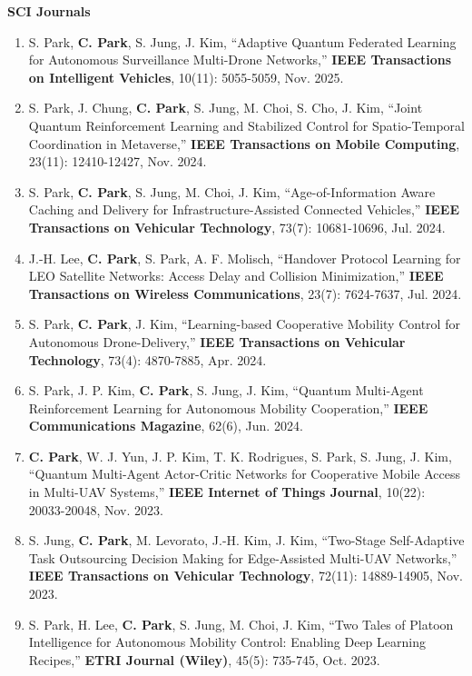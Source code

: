 \documentclass[10.5pt,a4paper]{article}
\begin{document}
\textbf{SCI Journals}
\begin{enumerate}[leftmargin=1.4em, itemsep=3pt, topsep=2pt]
  \item S. Park, \textbf{C. Park}, S. Jung, J. Kim, ``Adaptive Quantum Federated Learning for Autonomous Surveillance Multi-Drone Networks,'' \textbf{IEEE Transactions on Intelligent Vehicles}, 10(11): 5055-5059, Nov. 2025.
  \item S. Park, J. Chung, \textbf{C. Park}, S. Jung, M. Choi, S. Cho, J. Kim, ``Joint Quantum Reinforcement Learning and Stabilized Control for Spatio-Temporal Coordination in Metaverse,'' \textbf{IEEE Transactions on Mobile Computing}, 23(11): 12410-12427, Nov. 2024.
  \item S. Park, \textbf{C. Park}, S. Jung, M. Choi, J. Kim, ``Age-of-Information Aware Caching and Delivery for Infrastructure-Assisted Connected Vehicles,'' \textbf{IEEE Transactions on Vehicular Technology}, 73(7): 10681-10696, Jul. 2024.
  \item J.-H. Lee, \textbf{C. Park}, S. Park, A. F. Molisch, ``Handover Protocol Learning for LEO Satellite Networks: Access Delay and Collision Minimization,'' \textbf{IEEE Transactions on Wireless Communications}, 23(7): 7624-7637, Jul. 2024.
  \item S. Park, \textbf{C. Park}, J. Kim, ``Learning-based Cooperative Mobility Control for Autonomous Drone-Delivery,'' \textbf{IEEE Transactions on Vehicular Technology}, 73(4): 4870-7885, Apr. 2024.
  \item S. Park, J. P. Kim, \textbf{C. Park}, S. Jung, J. Kim, ``Quantum Multi-Agent Reinforcement Learning for Autonomous Mobility Cooperation,'' \textbf{IEEE Communications Magazine}, 62(6), Jun. 2024.
  \item \textbf{C. Park}, W. J. Yun, J. P. Kim, T. K. Rodrigues, S. Park, S. Jung, J. Kim, ``Quantum Multi-Agent Actor-Critic Networks for Cooperative Mobile Access in Multi-UAV Systems,'' \textbf{IEEE Internet of Things Journal}, 10(22): 20033-20048, Nov. 2023.
  \item S. Jung, \textbf{C. Park}, M. Levorato, J.-H. Kim, J. Kim, ``Two-Stage Self-Adaptive Task Outsourcing Decision Making for Edge-Assisted Multi-UAV Networks,'' \textbf{IEEE Transactions on Vehicular Technology}, 72(11): 14889-14905, Nov. 2023.
  \item S. Park, H. Lee, \textbf{C. Park}, S. Jung, M. Choi, J. Kim, ``Two Tales of Platoon Intelligence for Autonomous Mobility Control: Enabling Deep Learning Recipes,'' \textbf{ETRI Journal (Wiley)}, 45(5): 735-745, Oct. 2023.

\end{enumerate}
\end{document}
